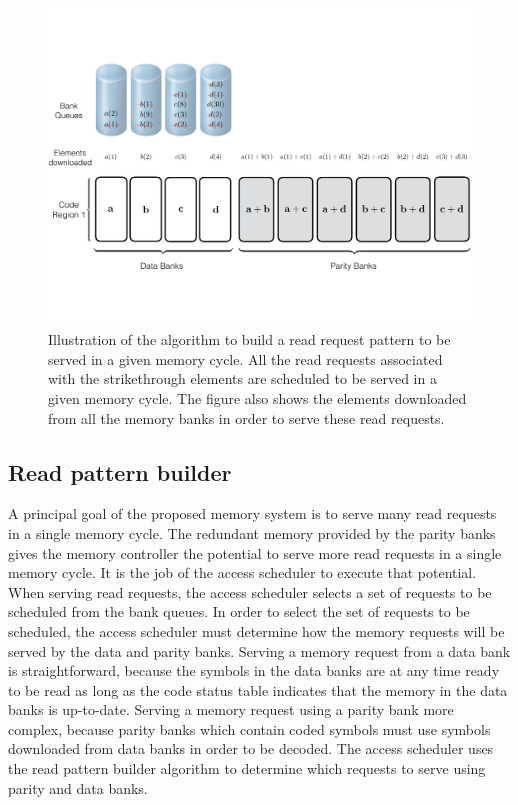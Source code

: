 \begin{figure}[htbp]
	\centering
	\includegraphics[width=0.96\linewidth]{fig/Read-Algo-Example.pdf}
	\caption{{Illustration of the algorithm to build a read request pattern to be served in a given memory cycle. All the read requests associated with the strikethrough elements are scheduled to be served in a given memory cycle. The figure also shows the elements downloaded from all the memory banks in order to serve these read requests.}}
	\label{fig:readAlgoAccessPattern}
\end{figure}
\subsection{Read pattern builder}
\label{sec:readCodingAlgo}
A principal goal of the proposed memory system is to serve many read requests in a single memory cycle. The redundant memory provided by the parity banks gives the memory controller the potential to serve more read requests in a single memory cycle. It is the job of the access scheduler to execute that potential. When serving read requests, the access scheduler selects a set of requests to be scheduled from the bank queues. In order to select the set of requests to be scheduled, the access scheduler must determine how the memory requests will be served by the data and parity banks. Serving a memory request from a data bank is straightforward, because  the symbols in the data banks are at any time ready to be read as long as the code status table indicates that the memory in the data banks is up-to-date. Serving a memory request using a parity bank more complex, because parity banks which contain coded symbols must use symbols downloaded from data banks in order to be decoded. The access scheduler uses the read pattern builder algorithm to determine which requests to serve using parity and data banks. 


